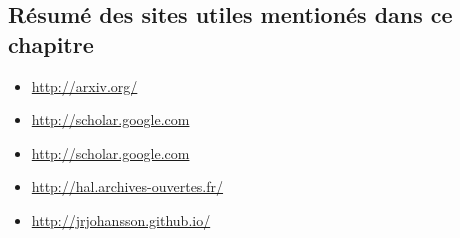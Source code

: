 \subsection*{R\'esum\'e des sites utiles mentionés dans ce chapitre}

\begin{itemize}
\item[\color{orange_js}{$\startri$}]
\url{http://arxiv.org/}
 \item[\color{orange_js}{$\startri$}]
\url{http://scholar.google.com}
 \item[\color{orange_js}{$\startri$}]
\url{http://scholar.google.com} \item[\color{orange_js}{$\stardble$}]
\url{http://hal.archives-ouvertes.fr/}
  \item[\color{orange_js}{$\stardble$}]
\url{http://jrjohansson.github.io/}
\end{itemize}
